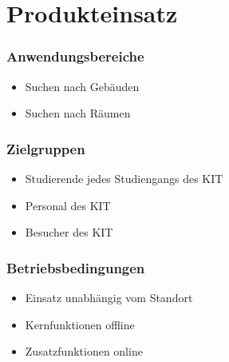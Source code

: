 \section{Produkteinsatz}

\begin{frame}\frametitle{Anwendungsbereiche}
    \begin{itemize}
        \item Suchen nach Gebäuden
        \item Suchen nach Räumen
    \end{itemize}
\end{frame}

\begin{frame}\frametitle{Zielgruppen}
    \begin{itemize}
        \item Studierende jedes Studiengangs des KIT
        \item Personal des KIT
        \item Besucher des KIT
    \end{itemize}
\end{frame}

\begin{frame}\frametitle{Betriebsbedingungen}
    \begin{itemize}
        \item Einsatz unabhängig vom Standort
        \item Kernfunktionen offline
        \item Zusatzfunktionen online
    \end{itemize}
\end{frame}